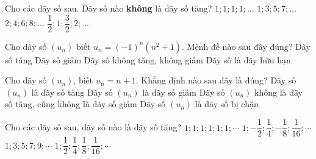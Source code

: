 \begin{ex}%
	Cho các dãy số sau.  Dãy số nào \textbf{không} là dãy số tăng?
	\choice 
		{\True  $1; 1; 1; 1; \ldots$}
		{$1; 3; 5;  7; \ldots$}
		{$2; 4; 6; 8; \ldots$} 
		{$\dfrac{1}{2}; 1;  \dfrac{3}{2}; 2; \ldots$}
\end{ex}

\begin{ex}%
	Cho dãy số $(u_n)$ biết $u_n=\left(-1\right)^n \left(n^2+1\right)$. Mệnh đề nào  sau đây đúng?
	\choice 
		{Dãy số tăng} 
		{Dãy  số giảm}
		{\True Dãy số  không tăng, không giảm}
		 {Dãy số là dãy hữu hạn}
\end{ex}

\begin{ex}%
	Cho dãy số $(u_n)$, biết $u_n=n+1$. Khẳng định nào sau đây  là đúng?
	\choice 
		{\True Dãy số $(u_n)$ là dãy số  tăng}
		{Dãy số $(u_n)$ là dãy  số giảm}
		{Dãy số $(u_n)$ không là dãy số tăng, cũng không là  dãy số giảm}
		{Dãy số $(u_n)$ là dãy số  bị chặn}
\end{ex}

\begin{ex}%
	Cho các dãy số sau, dãy số nào là dãy  số tăng?
	\choice 
		{$1; 1;  1; 1; 1; 1;\cdots$}
		{$1; -\dfrac{1}{2}; \dfrac{1}{4}; -\dfrac{1}{8};  \dfrac{1}{16};\cdots$}
		{\True $1; 3; 5; 7;  9;\cdots$}
		{$1;  \dfrac{1}{2}; \dfrac{1}{4}; \dfrac{1}{8}; \dfrac{1}{16};\cdots$}
\end{ex}

